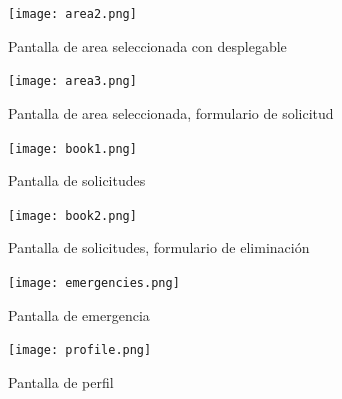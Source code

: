 \documentclass{article}
\begin{document}
    \begin{figure}[H]
        \centerline{\texttt{[image: area2.png]}}
        \caption{Pantalla de area seleccionada con desplegable}
        \label{fig:area2}
    \end{figure}

    \begin{figure}[H]
        \centerline{\texttt{[image: area3.png]}}
        \caption{Pantalla de area seleccionada, formulario de solicitud}
        \label{fig:area3}
    \end{figure}

    \begin{figure}[H]
        \centerline{\texttt{[image: book1.png]}}
        \caption{Pantalla de solicitudes}
        \label{fig:book1}
    \end{figure}

    \begin{figure}[H]
        \centerline{\texttt{[image: book2.png]}}
        \caption{Pantalla de solicitudes, formulario de eliminación}
        \label{fig:book2}
    \end{figure}

    \begin{figure}[H]
        \centerline{\texttt{[image: emergencies.png]}}
        \caption{Pantalla de emergencia}
        \label{fig:emergencies}
    \end{figure}

    \begin{figure}[H]
        \centerline{\texttt{[image: profile.png]}}
        \caption{Pantalla de perfil}
        \label{fig:profile}
    \end{figure}
\end{document}
